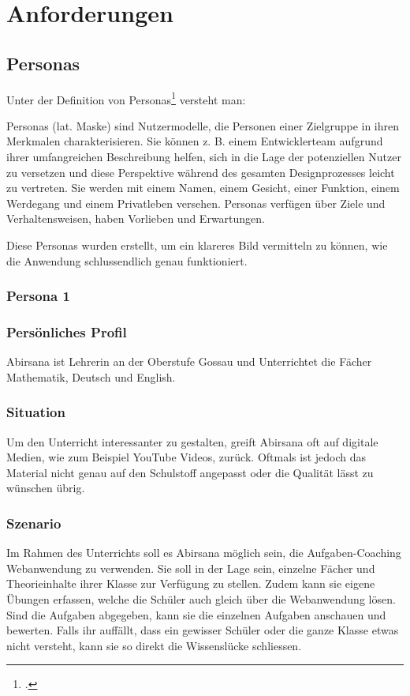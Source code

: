 \section{Anforderungen}

\subsection{Personas}
Unter der Definition von Personas\footcite{persona_definition} versteht man: 
\begin{displayquote}
Personas (lat. Maske) sind Nutzermodelle, die Personen einer Zielgruppe in ihren Merkmalen charakterisieren. Sie können z. B. einem Entwicklerteam aufgrund ihrer umfangreichen Beschreibung helfen, sich in die Lage der potenziellen Nutzer zu versetzen und diese Perspektive während des gesamten Designprozesses leicht zu vertreten. Sie werden mit einem Namen, einem Gesicht, einer Funktion, einem Werdegang und einem Privatleben versehen. Personas verfügen über Ziele und Verhaltensweisen, haben Vorlieben und Erwartungen.
\end{displayquote}

\noindent
Diese Personas wurden erstellt, um ein klareres Bild vermitteln zu können, wie die Anwendung schlussendlich genau funktioniert.

\subsubsection{Persona 1}
\subsubsection*{Persönliches Profil}
Abirsana ist Lehrerin an der Oberstufe Gossau und Unterrichtet die Fächer Mathematik, Deutsch und English.

\subsubsection*{Situation}
Um den Unterricht interessanter zu gestalten, greift Abirsana oft auf digitale Medien, wie zum Beispiel YouTube Videos, zurück. Oftmals ist jedoch das Material nicht genau auf den Schulstoff angepasst oder die Qualität lässt zu wünschen übrig.

\subsubsection*{Szenario}
Im Rahmen des Unterrichts soll es Abirsana möglich sein, die Aufgaben-Coaching Webanwendung zu verwenden. Sie soll in der Lage sein, einzelne Fächer und Theorieinhalte ihrer Klasse zur Verfügung zu stellen. Zudem kann sie eigene Übungen erfassen, welche die Schüler auch gleich über die Webanwendung lösen. Sind die Aufgaben abgegeben, kann sie die einzelnen Aufgaben anschauen und bewerten. Falls ihr auffällt, dass ein gewisser Schüler oder die ganze Klasse etwas nicht versteht, kann sie so direkt die Wissenslücke schliessen.


